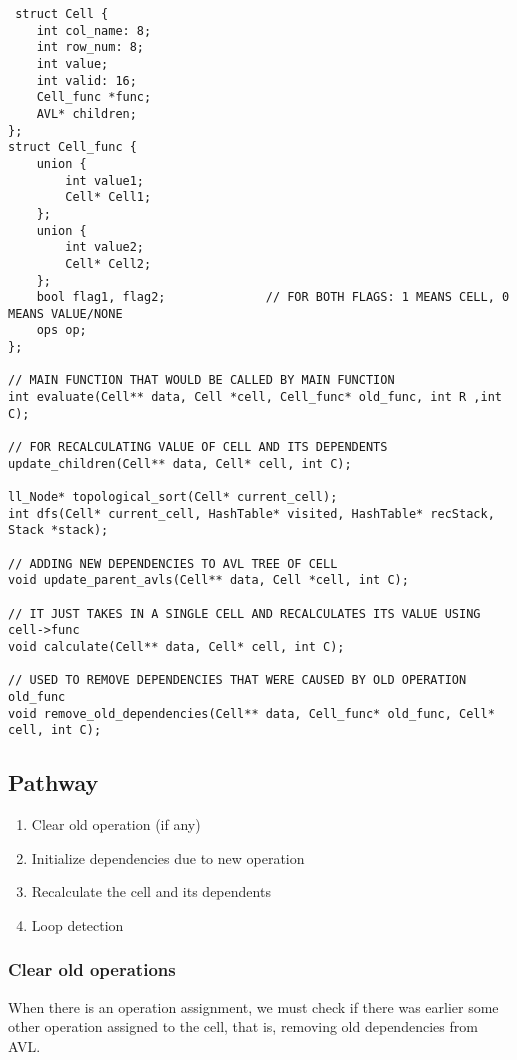 \documentclass{article}
\begin{document}
 \begin{lstlisting}
 struct Cell {
    int col_name: 8;           
    int row_num: 8;
    int value; 
    int valid: 16;                      
    Cell_func *func;
    AVL* children;
};
struct Cell_func {
    union {
        int value1;
        Cell* Cell1;
    };
    union {
        int value2;
        Cell* Cell2;
    };
    bool flag1, flag2;              // FOR BOTH FLAGS: 1 MEANS CELL, 0 MEANS VALUE/NONE
    ops op;        
};

// MAIN FUNCTION THAT WOULD BE CALLED BY MAIN FUNCTION
int evaluate(Cell** data, Cell *cell, Cell_func* old_func, int R ,int C);   

// FOR RECALCULATING VALUE OF CELL AND ITS DEPENDENTS
update_children(Cell** data, Cell* cell, int C);    

ll_Node* topological_sort(Cell* current_cell);
int dfs(Cell* current_cell, HashTable* visited, HashTable* recStack, Stack *stack);

// ADDING NEW DEPENDENCIES TO AVL TREE OF CELL
void update_parent_avls(Cell** data, Cell *cell, int C);

// IT JUST TAKES IN A SINGLE CELL AND RECALCULATES ITS VALUE USING cell->func
void calculate(Cell** data, Cell* cell, int C);

// USED TO REMOVE DEPENDENCIES THAT WERE CAUSED BY OLD OPERATION old_func
void remove_old_dependencies(Cell** data, Cell_func* old_func, Cell* cell, int C);

\end{lstlisting}
\subsection{Pathway}
\begin{enumerate}
    \item Clear old operation (if any)
    \item Initialize dependencies due to new operation
    \item Recalculate the cell and its dependents
    \item Loop detection

\end{enumerate}
\subsubsection{Clear old operations}
When there is an operation assignment, we must check if there was earlier some other operation assigned to the cell, that is, removing old dependencies from AVL. 
\end{document}
